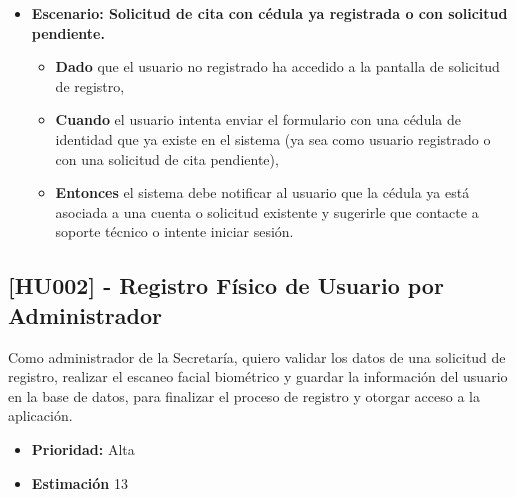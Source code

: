 \documentclass[12pt]{article}
\begin{document}
\begin{itemize}
	\item \textbf{Escenario: Solicitud de cita con cédula ya registrada o con solicitud pendiente.}
	\begin{itemize}
		\item \textbf{Dado} que el usuario no registrado ha accedido a la pantalla de solicitud de registro,
		\item \textbf{Cuando} el usuario intenta enviar el formulario con una cédula de identidad que ya existe en el sistema (ya sea como usuario registrado o con una solicitud de cita pendiente),
		\item \textbf{Entonces} el sistema debe notificar al usuario que la cédula ya está asociada a una cuenta o solicitud existente y sugerirle que contacte a soporte técnico o intente iniciar sesión.
	\end{itemize}
\end{itemize}

\pagebreak

\subsection{[HU002] - Registro Físico de Usuario por Administrador}

Como administrador de la Secretaría, quiero validar los datos de una solicitud de registro, realizar el escaneo facial biométrico y guardar la información del usuario en la base de datos, para finalizar el proceso de registro y otorgar acceso a la aplicación.

\begin{itemize}
	\item \textbf{Prioridad:} Alta
	\item \textbf{Estimación} 13
\end{itemize}
\end{document}
